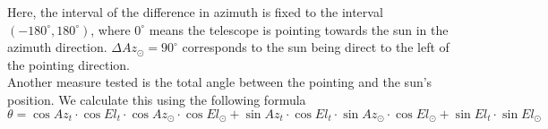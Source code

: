 Here, the interval of the difference in azimuth is fixed to the interval $(-180^\circ,180^\circ)$,
where $0^\circ$ means the telescope is pointing towards the sun in the azimuth direction.
$\Delta \textit{Az}_\odot = 90^\circ$ corresponds to the sun being direct to the left of the pointing direction. \\

Another measure tested is the total angle between the pointing and the sun's position. We calculate this using the following formula
\begin{equation}
    \theta = \cos \textit{Az}_t \cdot \cos \textit{El}_t\cdot \cos \textit{Az}_\odot \cdot \cos \textit{El}_\odot + \sin \textit{Az}_t \cdot \cos \textit{El}_t\cdot \sin \textit{Az}_\odot \cdot \cos \textit{El}_\odot + \sin \textit{El}_t \cdot \sin \textit{El}_\odot
\end{equation}
